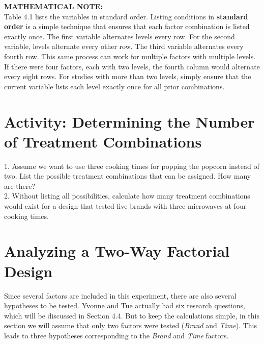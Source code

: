 \documentclass[
]{report}
\begin{document}
\large

\textbf{MATHEMATICAL NOTE:}\\
Table 4.1 lists the variables in standard order. Listing conditions in \textbf{standard order} is a simple technique that ensures that each factor combination is listed exactly once. The first variable alternates levels every row. For the second variable, levels alternate every other row. The third variable alternates every fourth row. This same process can work for multiple factors with multiple levels. If there were four factors, each with two levels, the fourth column would alternate every eight rows. For studies with more than two levels, simply ensure that the current variable lists each level exactly once for all prior combinations.
\normalsize

\hypertarget{activity-determining-the-number-of-treatment-combinations}{%
\section*{Activity: Determining the Number of Treatment Combinations}\label{activity-determining-the-number-of-treatment-combinations}}

1. Assume we want to use three cooking times for popping the popcorn instead of two. List the possible treatment combinations that can be assigned. How many are there?\\
2. Without listing all possibilities, calculate how many treatment combinations would exist for a design that tested five brands with three microwaves at four cooking times.

\hypertarget{analyzing-a-two-way-factorial-design}{%
\section{\texorpdfstring{\textbf{Analyzing a Two-Way Factorial Design}}{Analyzing a Two-Way Factorial Design}}\label{analyzing-a-two-way-factorial-design}}

Since several factors are included in this experiment, there are also several hypotheses to be tested. Yvonne and Tue actually had six research questions, which will be discussed in Section 4.4. But to keep the calculations simple, in this section we will assume that only two factors were tested (\emph{Brand} and \emph{Time}). This leads to three hypotheses corresponding to the \emph{Brand} and \emph{Time} factors.
\end{document}
